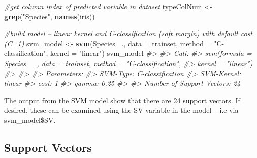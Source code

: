 \documentclass[]{book}
\newenvironment{Shaded}{\begin{snugshade}}{\end{snugshade}}
\newcommand{\CommentTok}[1]{\textcolor[rgb]{0.56,0.35,0.01}{\textit{#1}}}
\newcommand{\DataTypeTok}[1]{\textcolor[rgb]{0.13,0.29,0.53}{#1}}
\newcommand{\KeywordTok}[1]{\textcolor[rgb]{0.13,0.29,0.53}{\textbf{#1}}}
\newcommand{\NormalTok}[1]{#1}
\newcommand{\OperatorTok}[1]{\textcolor[rgb]{0.81,0.36,0.00}{\textbf{#1}}}
\newcommand{\StringTok}[1]{\textcolor[rgb]{0.31,0.60,0.02}{#1}}
\begin{document}
\begin{Shaded}
\begin{Highlighting}[]
\CommentTok{#get column index of predicted variable in dataset}
\NormalTok{typeColNum <-}\StringTok{ }\KeywordTok{grep}\NormalTok{(}\StringTok{"Species"}\NormalTok{, }\KeywordTok{names}\NormalTok{(iris))}

\CommentTok{#build model – linear kernel and C-classification (soft margin) with default cost (C=1)}
\NormalTok{svm_model <-}\StringTok{ }\KeywordTok{svm}\NormalTok{(Species}\OperatorTok{~}\StringTok{ }\NormalTok{., }\DataTypeTok{data =}\NormalTok{ trainset, }
                 \DataTypeTok{method =} \StringTok{"C-classification"}\NormalTok{, }
                 \DataTypeTok{kernel =} \StringTok{"linear"}\NormalTok{)}
\NormalTok{svm_model}
\CommentTok{#> }
\CommentTok{#> Call:}
\CommentTok{#> svm(formula = Species ~ ., data = trainset, method = "C-classification", }
\CommentTok{#>     kernel = "linear")}
\CommentTok{#> }
\CommentTok{#> }
\CommentTok{#> Parameters:}
\CommentTok{#>    SVM-Type:  C-classification }
\CommentTok{#>  SVM-Kernel:  linear }
\CommentTok{#>        cost:  1 }
\CommentTok{#>       gamma:  0.25 }
\CommentTok{#> }
\CommentTok{#> Number of Support Vectors:  24}
\end{Highlighting}
\end{Shaded}

The output from the SVM model show that there are 24 support vectors. If desired, these can be examined using the SV variable in the model -- i.e via svm\_model\$SV.

\hypertarget{support-vectors}{%
\subsection{Support Vectors}\label{support-vectors}}
\end{document}
